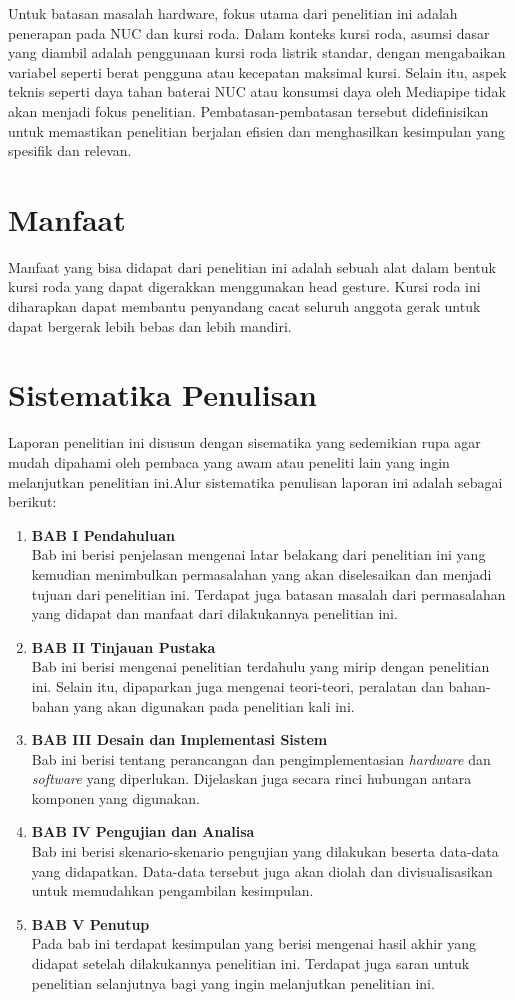 Untuk batasan masalah hardware, fokus utama dari penelitian ini adalah penerapan pada NUC dan kursi roda. Dalam konteks kursi roda, asumsi dasar yang diambil adalah penggunaan kursi roda listrik standar, dengan mengabaikan variabel seperti berat pengguna atau kecepatan maksimal kursi. Selain itu, aspek teknis seperti daya tahan baterai NUC atau konsumsi daya oleh Mediapipe tidak akan menjadi fokus penelitian. Pembatasan-pembatasan tersebut didefinisikan untuk memastikan penelitian berjalan efisien dan menghasilkan kesimpulan yang spesifik dan relevan.

\section{Manfaat}
Manfaat yang bisa didapat dari penelitian ini adalah sebuah alat dalam bentuk kursi roda yang dapat digerakkan menggunakan head gesture. Kursi roda ini diharapkan dapat membantu penyandang cacat seluruh anggota gerak untuk dapat bergerak lebih bebas dan lebih mandiri.

\section{Sistematika Penulisan}
Laporan penelitian ini disusun dengan sisematika yang sedemikian rupa agar mudah dipahami oleh pembaca yang awam atau peneliti lain yang ingin melanjutkan penelitian ini.Alur sistematika penulisan laporan ini adalah sebagai berikut:
\begin{enumerate}
\item \textbf{BAB I Pendahuluan} \\
Bab ini berisi penjelasan mengenai latar belakang dari penelitian ini yang kemudian menimbulkan permasalahan yang akan diselesaikan dan menjadi tujuan dari penelitian ini. Terdapat juga batasan masalah dari permasalahan yang didapat dan manfaat dari dilakukannya penelitian ini.
\item \textbf{BAB II Tinjauan Pustaka} \\
Bab ini berisi mengenai penelitian terdahulu yang mirip dengan penelitian ini. Selain itu, dipaparkan juga mengenai teori-teori, peralatan dan bahan-bahan yang akan digunakan pada penelitian kali ini.
\item \textbf{BAB III Desain dan Implementasi Sistem} \\
Bab ini berisi tentang perancangan dan pengimplementasian \emph{hardware} dan \emph{software} yang diperlukan. Dijelaskan juga secara rinci hubungan antara komponen yang digunakan.
\item \textbf{BAB IV Pengujian dan Analisa} \\
Bab ini berisi skenario-skenario pengujian yang dilakukan beserta data-data yang didapatkan. Data-data tersebut juga akan diolah dan divisualisasikan untuk memudahkan pengambilan kesimpulan.
\item \textbf{BAB V Penutup} \\
Pada bab ini terdapat kesimpulan yang berisi mengenai hasil akhir yang didapat setelah dilakukannya penelitian ini. Terdapat juga saran untuk penelitian selanjutnya bagi yang ingin melanjutkan penelitian ini.
\end{enumerate}

